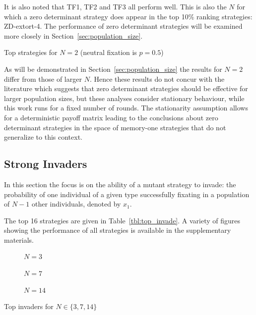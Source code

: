 \documentclass[10pt,journal]{IEEEtran}
\begin{document}
It is also noted that TF1, TF2 and TF3 all perform well. This is also the \(N\)
for which a zero determinant strategy does appear in the top 10\% ranking
strategies: ZD-extort-4. The performance of zero determinant strategies will be
examined more closely in Section~\ref{sec:population_size}.

\begin{table}[!hbtp]
    \tiny
    \centering
    \scalebox{0.95}{}
    \caption{Top strategies for \(N=2\) (neutral fixation is \(p=0.5\))}
    \label{tbl:summary_top_2}
\end{table}

As will be demonstrated in Section~\ref{sec:population_size} the results for
\(N=2\) differ from those of larger $N$. Hence these results do not concur with
the literature which suggests that zero determinant strategies should be
effective for larger population sizes, but these analyses consider stationary
behaviour, while this work runs for a fixed number of rounds. \cite{stewart2013extortion}
The stationarity assumption allows for a deterministic payoff matrix
leading to the conclusions about zero determinant strategies in the space
of memory-one strategies that do not generalize to this context.


\subsection{Strong Invaders}\label{sec:strong_invaders}

In this section the focus is on the ability of a mutant strategy to invade: the
probability of one individual of a given type successfully fixating in a
population of \(N - 1\) other individuals, denoted by \(x_1\).

The top 16 strategies are given in Table~\ref{tbl:top_invade}. A variety of
figures showing the performance of all strategies is available in the
supplementary materials.

\begin{table}[!hbtp]
    \centering
    \tiny
    \begin{subfigure}[t]{\columnwidth}
        \centering
        
        \caption{\(N=3\)}
    \end{subfigure}%

    \begin{subfigure}[t]{\columnwidth}
        \centering
        
        \caption{\(N=7\)}
    \end{subfigure}

    \begin{subfigure}[t]{\columnwidth}
        \centering
        
        \caption{\(N=14\)}
    \end{subfigure}
    \caption{Top invaders for \(N\in\{3, 7, 14\}\)}
    \label{tbl:top_invade}
\end{table}
\end{document}
